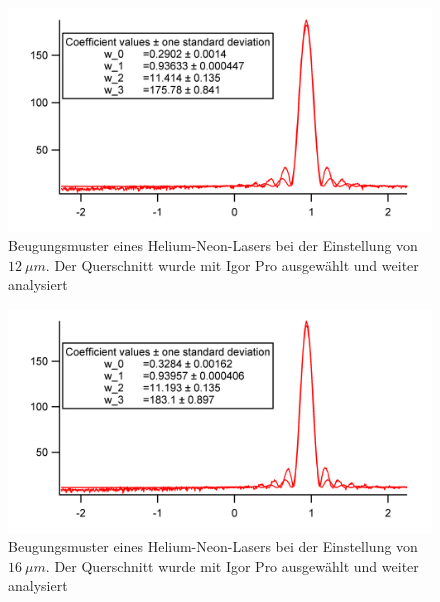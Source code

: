 \begin{figure}[H]
	\centering	
	\begin{minipage}{1\textwidth}
		\includegraphics[width=\columnwidth]{180618/Graph3.png}
	\end{minipage}
	\caption{Beugungsmuster eines Helium-Neon-Lasers bei der Einstellung von $12~\mu m$. Der Querschnitt wurde mit Igor Pro ausgewählt und weiter analysiert }
	\label{HeNe_3}
\end{figure}
\begin{figure}[H]
	\centering	
	\begin{minipage}{1\textwidth}
		\includegraphics[width=\columnwidth]{180618/Graph4.png}
	\end{minipage}
	\caption{Beugungsmuster eines Helium-Neon-Lasers bei der Einstellung von $16~\mu m$. Der Querschnitt wurde mit Igor Pro ausgewählt und weiter analysiert }
	\label{HeNe_4}
\end{figure}

